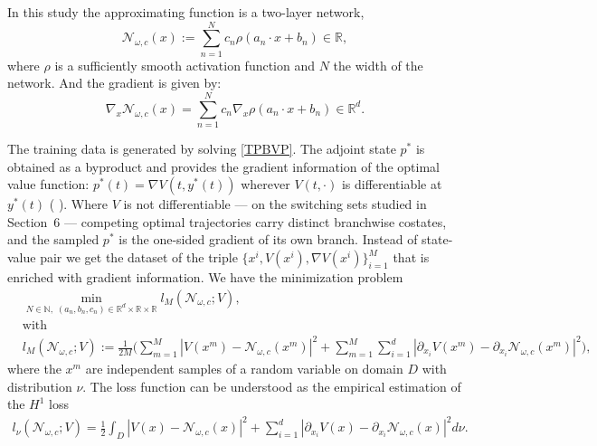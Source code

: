 \documentclass[11pt]{amsart}
\theoremstyle{definition}
\theoremstyle{remark}
\begin{document}
In this study the approximating function is a two-layer network,
\begin{equation}
	\mathcal{N}_{\omega, c}(x) := \sum_{n = 1}^N c_n \rho (a_n \cdot x + b_n) \in \mathbb{R},
\end{equation}
where $\rho$ is a sufficiently smooth activation function and $N$ the width of the network. 
And the gradient is given by: 
\begin{equation*}
	\nabla_x  \mathcal{N}_{\omega, c}(x) =  \sum_{ n = 1}^N c_n \nabla_x \rho(a_n \cdot x + b_n) \in \mathbb{R}^d .
\end{equation*}

The training data is generated by solving \eqref{TPBVP}. 
The adjoint state $p^*$ is obtained as a byproduct and provides the gradient information of the optimal value function: $p^*(t) = \nabla V(t, y^*(t))$ wherever $V(t, \cdot)$ is differentiable at $y^*(t)$ (\cite{cristiani2010initialization} \cite{cannarsa1991some} \cite{clarke1987relationship}). Where $V$ is not differentiable --- on the switching sets studied in Section~6 --- competing optimal trajectories carry distinct branchwise costates, and the sampled $p^*$ is the one-sided gradient of its own branch. 
Instead of state-value pair we get the dataset of the triple $\{x^i, V(x^i), \nabla V(x^i)\}_{i = 1}^M$ that is enriched with gradient information.
We have the minimization problem
\begin{equation}
\label{lost_dis}
\begin{aligned}
	&\min_{N \in \mathbb{N},\; (a_n, b_n, c_n) \in \mathbb{R}^d \times \mathbb{R} \times \mathbb{R}} l_M (\mathcal{N}_{\omega, c}; V),\\
	& \text{with}\\
	& l_M (\mathcal{N}_{\omega, c}; V) := \frac{1}{2M} \bigg( \sum_{m = 1}^M  |V(x^m) - \mathcal{N}_{\omega, c} (x^m)|^2 +  \sum_{m = 1}^M \sum_{i = 1}^d | \partial_{x_i} V(x^m) - \partial_{x_i} \mathcal{N}_{\omega, c} (x^m) |^2 \bigg),
\end{aligned}
\end{equation}
where the $x^m$ are independent samples of a random variable on domain $D$ with distribution $\nu$.
The loss function can be understood as the empirical estimation of the $H^1$ loss
\begin{align*}
	l_\nu (\mathcal{N}_{\omega, c}; V) = \frac{1}{2} \int_D |V(x) - \mathcal{N}_{\omega, c} (x)|^2 + \sum_{i = 1}^d | \partial_{x_i} V(x) - \partial_{x_i} \mathcal{N}_{\omega, c} (x) |^2 d\nu .
\end{align*}
\end{document}
